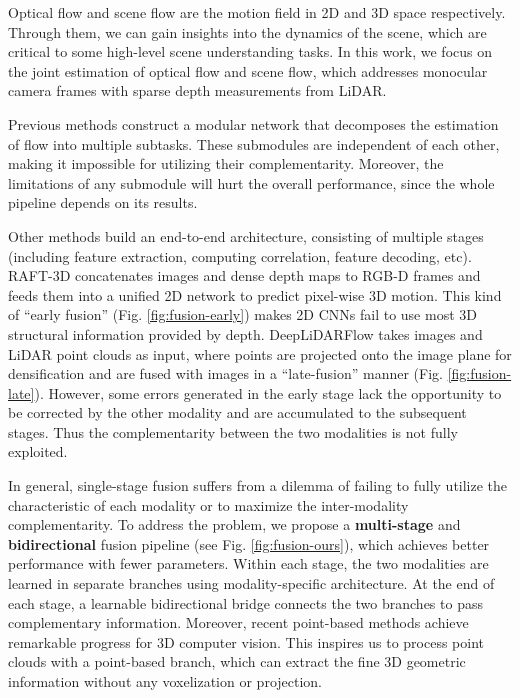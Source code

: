 \documentclass[10pt,twocolumn,letterpaper]{article}
\begin{document}
Optical flow and scene flow are the motion field in 2D and 3D space respectively. Through them, we can gain insights into the dynamics of the scene, which are critical to some high-level scene understanding tasks. In this work, we focus on the joint estimation of optical flow and scene flow, which addresses monocular camera frames with sparse depth measurements from LiDAR.

Previous methods \cite{yang2021rigidmask, ma2019drisf, yang2020opticalexp, behl2017isf} construct a modular network that decomposes the estimation of flow into multiple subtasks. These submodules are independent of each other, making it impossible for utilizing their complementarity. Moreover, the limitations of any submodule will hurt the overall performance, since the whole pipeline depends on its results.

Other methods \cite{teed2021raft3d, rishav2020deeplidarflow} build an end-to-end architecture, consisting of multiple stages (including feature extraction, computing correlation, feature decoding, etc). RAFT-3D \cite{teed2021raft3d} concatenates images and dense depth maps to RGB-D frames and feeds them into a unified 2D network to predict pixel-wise 3D motion. This kind of ``early fusion'' (Fig. \ref{fig:fusion-early}) makes 2D CNNs fail to use most 3D structural information provided by depth. DeepLiDARFlow \cite{rishav2020deeplidarflow} takes images and LiDAR point clouds as input, where points are projected onto the image plane for densification and are fused with images in a ``late-fusion'' manner (Fig. \ref{fig:fusion-late}). However, some errors generated in the early stage lack the opportunity to be corrected by the other modality and are accumulated to the subsequent stages. Thus the complementarity between the two modalities is not fully exploited.

In general, single-stage fusion suffers from a dilemma of failing to fully utilize the characteristic of each modality or to maximize the inter-modality complementarity. To address the problem, we propose a \textbf{multi-stage} and \textbf{bidirectional} fusion pipeline (see Fig. \ref{fig:fusion-ours}), which achieves better performance with fewer parameters. Within each stage, the two modalities are learned in separate branches using modality-specific architecture. At the end of each stage, a learnable bidirectional bridge connects the two branches to pass complementary information. Moreover, recent point-based methods \cite{qi2017pointnet, qi2017pointnet++, wu2019pointconv, liu2019flownet3d, wang2020flownet3d++, wu2019pointpwc, qi2018frustum, liu2019meteornet} achieve remarkable progress for 3D computer vision. This inspires us to process point clouds with a point-based branch, which can extract the fine 3D geometric information without any voxelization or projection.
\end{document}
